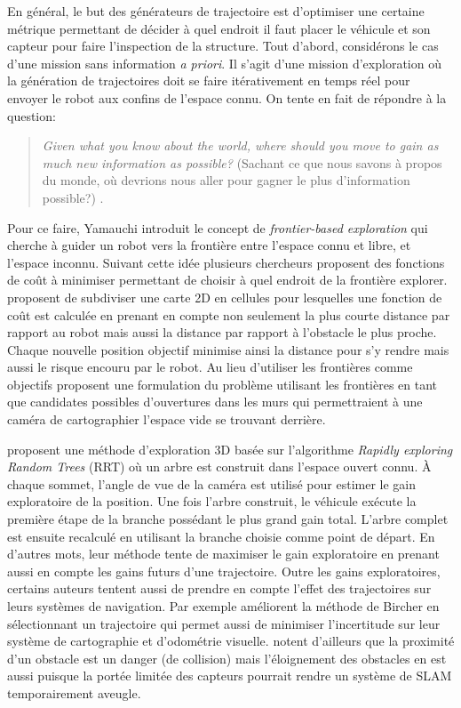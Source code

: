 En général, le but des générateurs de trajectoire est d'optimiser une certaine métrique permettant de décider à quel endroit il faut placer le véhicule et son capteur pour faire l'inspection de la structure. Tout d'abord, considérons le cas d'une mission sans information \textit{a priori}. Il s'agit d'une mission d'exploration où la génération de trajectoires doit se faire itérativement en temps réel pour envoyer le robot aux confins de l'espace connu. On tente en fait de répondre à la question:

\begin{quote}
  \emph{Given what you know about the world, where should you move to gain as much new information as possible?} (Sachant ce que nous savons à propos du monde, où devrions nous aller pour gagner le plus d'information possible?) \citep{Yamauchi1997}.
\end{quote}

Pour ce faire, Yamauchi introduit le concept de \textit{frontier-based exploration} qui cherche à guider un robot vers la frontière entre l'espace connu et libre, et l'espace inconnu. Suivant cette idée plusieurs chercheurs proposent des fonctions de coût à minimiser permettant de choisir à quel endroit de la frontière explorer. \citep{Wirth2007} proposent de subdiviser une carte 2D en cellules pour lesquelles une fonction de coût est calculée en prenant en compte non seulement la plus courte distance par rapport au robot mais aussi la distance par rapport à l'obstacle le plus proche. Chaque nouvelle position objectif minimise ainsi la distance pour s'y rendre mais aussi le risque encouru par le robot. Au lieu d'utiliser les frontières comme objectifs \citep{Dornhege2011} proposent une formulation du problème utilisant les frontières en tant que candidates possibles d'ouvertures dans les murs qui permettraient à une caméra de cartographier l'espace vide se trouvant derrière.

\citep{Bircher2016} proposent une méthode d'exploration 3D basée sur l'algorithme \textit{Rapidly exploring Random Trees} (RRT) où un arbre est construit dans l'espace ouvert connu. À chaque sommet, l'angle de vue de la caméra est utilisé pour estimer le gain exploratoire de la position. Une fois l'arbre construit, le véhicule exécute la première étape de la branche possédant le plus grand gain total. L'arbre complet est ensuite recalculé en utilisant la branche choisie comme point de départ. En d'autres mots, leur méthode tente de maximiser le gain exploratoire en prenant aussi en compte les gains futurs d'une trajectoire. Outre les gains exploratoires, certains auteurs tentent aussi de prendre en compte l'effet des trajectoires sur leurs systèmes de navigation. Par exemple \citep{Papachristos2017} améliorent la méthode de Bircher en sélectionnant un trajectoire qui permet aussi de minimiser l'incertitude sur leur système de cartographie et d'odométrie visuelle. \citep{Wirth2007} notent d'ailleurs que la proximité d'un obstacle est un danger (de collision) mais l'éloignement des obstacles en est aussi puisque la portée limitée des capteurs pourrait rendre un système de SLAM temporairement aveugle. 

